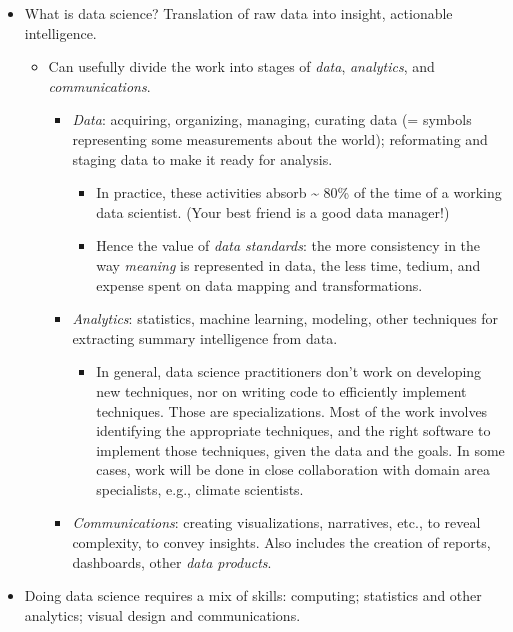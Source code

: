 \documentclass[
]{book}
\providecommand{\tightlist}{%
  \setlength{\itemsep}{0pt}\setlength{\parskip}{0pt}}
\begin{document}
\begin{itemize}
\tightlist
\item
  What is data science? Translation of raw data into insight, actionable intelligence.

  \begin{itemize}
  \tightlist
  \item
    Can usefully divide the work into stages of \emph{data}, \emph{analytics}, and \emph{communications}.

    \begin{itemize}
    \tightlist
    \item
      \emph{Data}: acquiring, organizing, managing, curating data (= symbols representing some measurements about the world); reformating and staging data to make it ready for analysis.

      \begin{itemize}
      \tightlist
      \item
        In practice, these activities absorb \textasciitilde{} 80\% of the time of a working data scientist. (Your best friend is a good data manager!)
      \item
        Hence the value of \emph{data standards}: the more consistency in the way \emph{meaning} is represented in data, the less time, tedium, and expense spent on data mapping and transformations.
      \end{itemize}
    \item
      \emph{Analytics}: statistics, machine learning, modeling, other techniques for extracting summary intelligence from data.

      \begin{itemize}
      \tightlist
      \item
        In general, data science practitioners don't work on developing new techniques, nor on writing code to efficiently implement techniques. Those are specializations. Most of the work involves identifying the appropriate techniques, and the right software to implement those techniques, given the data and the goals. In some cases, work will be done in close collaboration with domain area specialists, e.g., climate scientists.
      \end{itemize}
    \item
      \emph{Communications}: creating visualizations, narratives, etc., to reveal complexity, to convey insights. Also includes the creation of reports, dashboards, other \emph{data products}.
    \end{itemize}
  \end{itemize}
\item
  Doing data science requires a mix of skills: computing; statistics and other analytics; visual design and communications.
\end{itemize}
\end{document}
